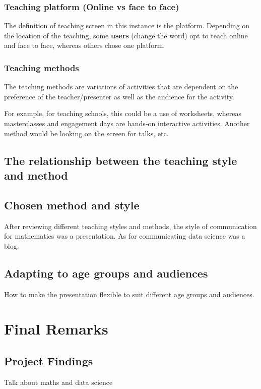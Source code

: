 \documentclass[12pt, a4paper,oneside]{book}
\numberwithin{equation}{section}
\begin{document}
\subsection{Teaching platform (Online vs face to face)}

The definition of teaching screen in this instance is the platform. Depending on the location of the teaching, some \textbf{users} (change the word) opt to teach online and face to face, whereas others chose one platform.

\subsection{Teaching methods}

The teaching methods are variations of activities that are dependent on the preference of the teacher/presenter as well as the audience for the activity.

For example, for teaching schools, this could be a use of worksheets, whereas masterclasses and engagement days are hands-on interactive activities. Another method would be looking on the screen for talks, etc.

\section{The relationship between the teaching style and method}

\section{Chosen method and style}

After reviewing different teaching styles and methods, the style of communication for mathematics was a presentation. As for communicating data science was a blog.

\section{Adapting to age groups and audiences}

How to make the presentation flexible to suit different age groups and audiences.

\chapter{Final Remarks}\label{ch:concl}
\section{Project Findings}
Talk about maths and data science
\end{document}
